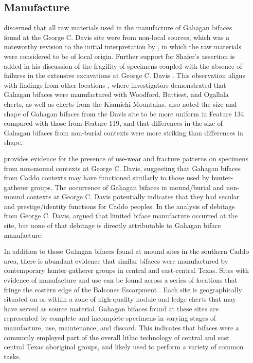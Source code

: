 \documentclass[review]{elsarticle}
\begin{document}
\subsection*{Manufacture}

\citet{RN3684} discerned that all raw materials used in the manufacture of Gahagan bifaces found at the George C. Davis site were from non-local sources, which was a noteworthy revision to the initial interpretation by \citet{RN800}, in which the raw materials were considered to be of local origin. Further support for Shafer’s assertion is added in his discussion of the fragility of specimens coupled with the absence of failures in the extensive excavations at George C. Davis \citep{RN3684}. This observation aligns with findings from other locations \citep{RN1001}, where investigators demonstrated that Gahagan bifaces were manufactured with Woodford, Battiest, and Ogallala cherts, as well as cherts from the Kiamichi Mountains. \citet{RN3684} also noted the size and shape of Gahagan bifaces from the Davis site to be more uniform in Feature 134 compared with those from Feature 119, and that differences in the size of Gahagan bifaces from non-burial contexts were more striking than differences in shape.

\citet{RN3684} provides evidence for the presence of use-wear and fracture patterns on specimens from non-mound contexts at George C. Davis, suggesting that Gahagan bifaces from Caddo contexts may have functioned similarly to those used by hunter-gatherer groups. The occurrence of Gahagan bifaces in mound/burial and non-mound contexts at George C. Davis potentially indicates that they had secular and prestige/identity functions for Caddo peoples. In the analysis of debitage from George C. Davis, \citet{RN3684} argued that limited biface manufacture occurred at the site, but none of that debitage is directly attributable to Gahagan biface manufacture.

In addition to those Gahagan bifaces found at mound sites in the southern Caddo area, there is abundant evidence that similar bifaces were manufactured by contemporary hunter-gatherer groups in central and east-central Texas. Sites with evidence of manufacture and use can be found across a series of locations that fringe the eastern edge of the Balcones Escarpment \citep[Figure 5-3]{RN11568}. Each site is geographically situated on or within a zone of high-quality nodule and ledge cherts that may have served as source material. Gahagan bifaces found at these sites are represented by complete and incomplete specimens in varying stages of manufacture, use, maintenance, and discard. This indicates that bifaces were a commonly employed part of the overall lithic technology of central and east central Texas aboriginal groups, and likely used to perform a variety of common tasks.
\end{document}

